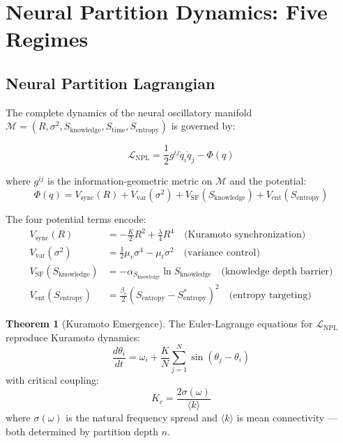 \documentclass[10pt,twocolumn,a4paper]{article}
\theoremstyle{definition}
\newtheorem{theorem}{Theorem}
\newcommand{\SE}{S_{\text{entropy}}}
\newcommand{\SK}{S_{\text{knowledge}}}
\newcommand{\ST}{S_{\text{time}}}
\newcommand{\calM}{\mathcal{M}}
\newcommand{\LNPL}{\mathcal{L}_{\text{NPL}}}
\begin{document}
\section{Neural Partition Dynamics: Five Regimes}
\label{sec:neural}

\subsection{Neural Partition Lagrangian}

The complete dynamics of the neural oscillatory manifold~\cite{buzsaki2004oscillations,varela2001brainweb,breakspear2010generative}
$\calM = (R, \sigma^2, \SK, \ST, \SE)$ is governed by:

\begin{equation}
\boxed{\LNPL = \frac{1}{2}g^{ij}\dot{q}_i\dot{q}_j - \Phi(q)}
\end{equation}

where $g^{ij}$ is the information-geometric metric on $\calM$ and the potential:
\begin{equation}
\Phi(q) = V_{\text{sync}}(R) + V_{\text{var}}(\sigma^2) + V_{\text{SF}}(\SK) + V_{\text{ent}}(\SE)
\end{equation}

The four potential terms encode:
\begin{align}
V_{\text{sync}}(R) &= -\frac{K}{2}R^2 + \frac{\lambda}{4}R^4 \quad \text{(Kuramoto synchronization)}\\
V_{\text{var}}(\sigma^2) &= \frac{1}{2}\mu_v \sigma^4 - \mu_t \sigma^2 \quad \text{(variance control)}\\
V_{\text{SF}}(\SK) &= -\alpha_{\SK}\ln\SK \quad \text{(knowledge depth barrier)}\\
V_{\text{ent}}(\SE) &= \frac{\beta_e}{2}(\SE - \SE^*)^2 \quad \text{(entropy targeting)}
\end{align}

\begin{theorem}[Kuramoto Emergence]
The Euler-Lagrange equations for $\LNPL$ reproduce Kuramoto dynamics:
\begin{equation}
\frac{d\theta_i}{dt} = \omega_i + \frac{K}{N}\sum_{j=1}^N \sin(\theta_j - \theta_i)
\end{equation}
with critical coupling:
\begin{equation}
K_c = \frac{2\sigma(\omega)}{\langle k \rangle}
\end{equation}
where $\sigma(\omega)$ is the natural frequency spread and $\langle k \rangle$ is
mean connectivity — both determined by partition depth $n$.
\end{theorem}
\end{document}
